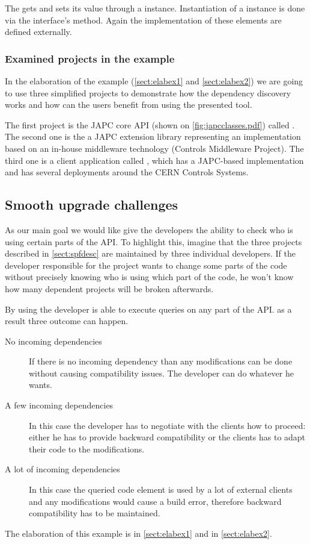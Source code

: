 The  gets and sets its value through a  instance.
Instantiation of a  instance is done via the
 interface's  method. Again the
implementation of these elements are defined externally.

\subsubsection{Examined projects in the example}
In the elaboration of the example (\autoref{sect:elabex1} and
\autoref{sect:elabex2}) we are going to use three simplified projects to
demonstrate how the dependency discovery works and how can the users benefit
from using the presented tool.

The first project is the JAPC core API (shown on \autoref{fig:japcclasses.pdf}) called .
The second one is the  a JAPC extension library representing an implementation based on 
an in-house middleware technology (Controls Middleware Project\cite{Cmw}). The
third one is a client application called , which has a JAPC-based implementation and has several deployments around the CERN Controls Systems.


\subsection{Smooth upgrade challenges}
As our main goal we would like give the developers the ability to check who is
using certain parts of the API. To highlight this, imagine that the three
projects described in \autoref{sect:spfdesc} are maintained by three individual developers. 
If the developer
responsible for the  project wants to change some parts of the
code without precisely knowing who is using which part of the code, he won't
know how many dependent projects will be broken afterwards. 

By using \ptool{} the developer is able to execute queries on any part of the
API. as a result three outcome can happen.
\begin{description}
  \item[No incoming dependencies] If there is no incoming dependency than any modifications can be done without
causing compatibility issues. The developer can do whatever he wants.
  \item[A few incoming dependencies] In this case the developer has to negotiate
with the clients how to proceed: either he has to provide backward compatibility or the
clients has to adapt their code to the modifications.
  \item[A lot of incoming dependencies] In this case the queried code
element is used by a lot of external clients and any modifications would cause a build
error, therefore backward compatibility has to be maintained.
\end{description}
The elaboration of this example is in \autoref{sect:elabex1} and in \autoref{sect:elabex2}.
